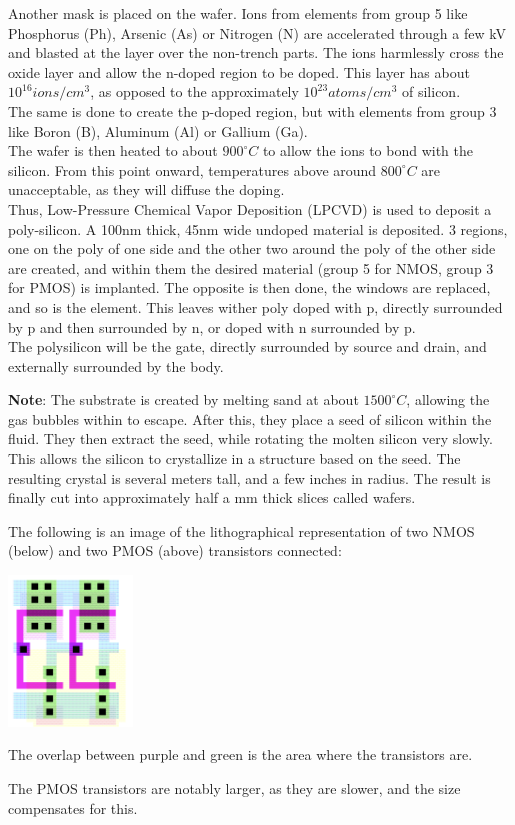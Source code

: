 \documentclass[nobib,fleqn,8pt]{article}
\begin{document}
Another mask is placed on the wafer. Ions from elements from group 5 like Phosphorus (Ph), Arsenic (As) or Nitrogen (N) are accelerated through a few kV and blasted at the layer over the non-trench parts. The ions harmlessly cross the oxide layer and allow the n-doped region to be doped. This layer has about $10^{16} ions/cm^3$, as opposed to the approximately $10^{23} atoms/cm^3$ of silicon.\\
The same is done to create the p-doped region, but with elements from group 3 like Boron (B), Aluminum (Al) or Gallium (Ga).\\
The wafer is then heated to about $900^\circ C$ to allow the ions to bond with the silicon. From this point onward, temperatures above around $800^\circ C$ are unacceptable, as they will diffuse the doping.\\
Thus, Low-Pressure Chemical Vapor Deposition (LPCVD) is used to deposit a poly-silicon. A 100nm thick, 45nm wide undoped material is deposited. 3 regions, one on the poly of one side and the other two around the poly of the other side are created, and within them the desired material (group 5 for NMOS, group 3 for PMOS) is implanted. The opposite is then done, the windows are replaced, and so is the element. This leaves wither poly doped with p, directly surrounded by p and then surrounded by n, or doped with n surrounded by p.\\
The polysilicon will be the gate, directly surrounded by source and drain, and externally surrounded by the body.

\begin{mdframed}
    \textbf{Note}: The substrate is created by melting sand at about $1500^\circ C$, allowing the gas bubbles within to escape. After this, they place a seed of silicon within the fluid. They then extract the seed, while rotating the molten silicon very slowly. This allows the silicon to crystallize in a structure based on the seed. The resulting crystal is several meters tall, and a few inches in radius. The result is finally cut into approximately half a mm thick slices called wafers.
\end{mdframed}
The following is an image of the lithographical representation of two NMOS (below) and two PMOS (above) transistors connected:
\begin{center}
    \includegraphics*[width = 125px]{images/pmos_nmos_lithography.png}
\end{center}
The overlap between purple and green is the area where the transistors are.
\begin{mdframed}
    The PMOS transistors are notably larger, as they are slower, and the size compensates for this.
\end{mdframed}
\end{document}
